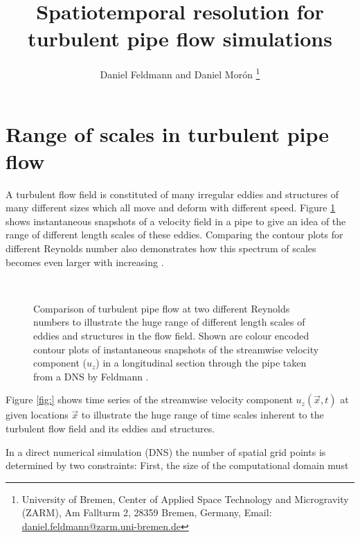 \documentclass[a4paper, 11pt, twoside, DIV=12]{scrartcl}
\title{Spatiotemporal resolution for\\ turbulent pipe flow simulations}
\subtitle{\vspace{-2.0ex}}
\author{Daniel Feldmann and Daniel Mor\'on%
\thanks{University of Bremen,
Center of Applied Space Technology and Microgravity (ZARM),
Am Fallturm 2, 28359 Bremen, Germany,
Email: \url{daniel.feldmann@zarm.uni-bremen.de}}
}
\begin{document}
%
\maketitle
%
\section{Range of scales in turbulent pipe flow}
A turbulent flow field is constituted of many irregular eddies and structures of
many different sizes which all move and deform with different speed. Figure
\ref{fig:plotPipePhiCompare} shows instantaneous snapshots of a velocity field
in a pipe to give an idea of the range of different length scales of these
eddies. Comparing the contour plots for different Reynolds number also
demonstrates how this spectrum of scales becomes even larger with increasing
\Reynolds.
\begin{figure}[htb]
\centering
{}\\
\caption{Comparison of turbulent pipe flow at two different Reynolds numbers to
illustrate the huge range of different length scales of eddies and structures in
the flow field. Shown are colour encoded contour plots of instantaneous
snapshots of the streamwise velocity component ($u_z$) in a longitudinal section
through the pipe taken from a DNS by Feldmann \cite{Feldmann2015c}.}
\label{fig:plotPipePhiCompare}
\end{figure}
Figure \ref{fig:} shows time series of the streamwise velocity component
$u_z(\vec{x},t)$ at given locations $\vec{x}$ to illustrate the huge range of
time scales inherent to the turbulent flow field and its eddies and structures.
\par
In a direct numerical simulation (DNS) the number of spatial grid points is
determined by two constraints: First, the size of the computational domain must
\end{document}

